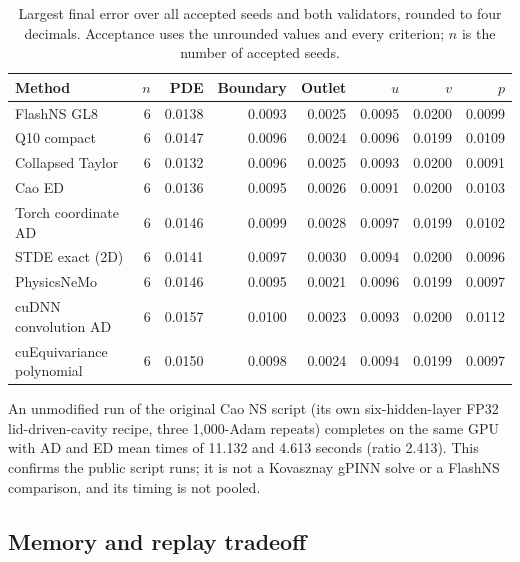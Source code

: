 \documentclass[11pt]{article}
\begin{document}
\begin{table}[t]
\centering\small
\setlength{\tabcolsep}{4pt}
\caption{Largest final error over all accepted seeds and both validators, rounded to four decimals. Acceptance uses the unrounded values and every criterion; $n$ is the number of accepted seeds.}
\label{tab:validation}
\begin{tabular}{lrrrrrrr}\toprule
Method & $n$ & PDE & Boundary & Outlet & $u$ & $v$ & $p$\\\midrule
FlashNS GL8 & 6 & 0.0138 & 0.0093 & 0.0025 & 0.0095 & 0.0200 & 0.0099\\
Q10 compact & 6 & 0.0147 & 0.0096 & 0.0024 & 0.0096 & 0.0199 & 0.0109\\
Collapsed Taylor & 6 & 0.0132 & 0.0096 & 0.0025 & 0.0093 & 0.0200 & 0.0091\\
Cao ED & 6 & 0.0136 & 0.0095 & 0.0026 & 0.0091 & 0.0200 & 0.0103\\
Torch coordinate AD & 6 & 0.0146 & 0.0099 & 0.0028 & 0.0097 & 0.0199 & 0.0102\\
STDE exact (2D) & 6 & 0.0141 & 0.0097 & 0.0030 & 0.0094 & 0.0200 & 0.0096\\
PhysicsNeMo & 6 & 0.0146 & 0.0095 & 0.0021 & 0.0096 & 0.0199 & 0.0097\\
cuDNN convolution AD & 6 & 0.0157 & 0.0100 & 0.0023 & 0.0093 & 0.0200 & 0.0112\\
cuEquivariance polynomial & 6 & 0.0150 & 0.0098 & 0.0024 & 0.0094 & 0.0199 & 0.0097\\
\bottomrule\end{tabular}
\end{table}

An unmodified run of the original Cao NS script (its own six-hidden-layer
FP32 lid-driven-cavity recipe, three 1,000-Adam repeats) completes on the
same GPU with AD and ED mean times of 11.132 and 4.613 seconds (ratio
2.413). This confirms the public script runs; it is not a Kovasznay gPINN
solve or a FlashNS comparison, and its timing is not pooled.

\subsection{Memory and replay tradeoff}
\end{document}
